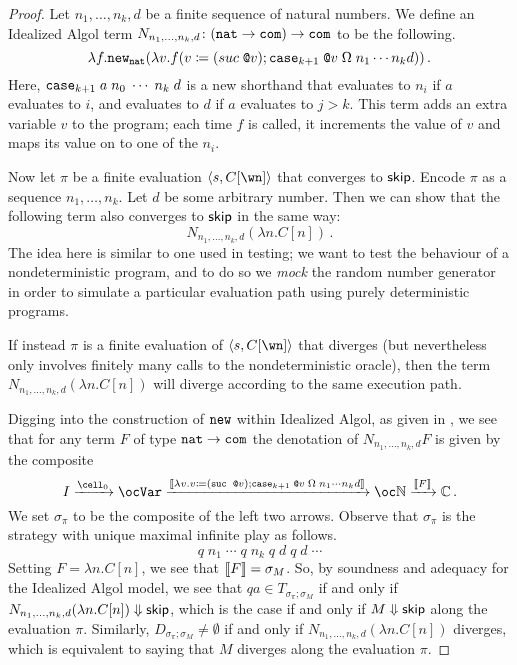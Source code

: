 \documentclass[sigplan,10pt,review]{acmart}\settopmatter{printfolios=true,printccs=false,printacmref=false}
\begin{document}
\begin{proof}
  Let $n_1,\dots,n_k,d$ be a finite sequence of natural numbers.  
  We define an Idealized Algol term $N_{n_1,\dots,n_k,d}\colon ({\mathtt{nat}} \to {\mathtt{com}}) \to {\mathtt{com}}$ to be the following.
  \[
    \lambda f.{\mathtt{new}}_{\mathtt{nat}} (\lambda v.f(v\coloneqq (suc\;\texttt{@} v); {\mathtt{case}}_{k+1}\;\texttt{@} v\;\Omega\;n_1 \cdots n_k d))\,.
    \]
  Here, ${\mathtt{case}}_{k+1}\;a\;n_0\;\cdots\;n_k\;d$ is a new shorthand that evaluates to $n_i$ if $a$ evaluates to $i$, and evaluates to $d$ if $a$ evaluates to $j> k$.
  This term adds an extra variable $v$ to the program; each time $f$ is called, it increments the value of $v$ and maps its value on to one of the $n_i$.  

  Now let $\pi$ be a finite evaluation $\ia s {C[\wn]}$ that converges to ${\mathsf{skip}}$.  
  Encode $\pi$ as a sequence $n_1,\dots,n_k$.  
  Let $d$ be some arbitrary number.
  Then we can show that the following term also converges to ${\mathsf{skip}}$ in the same way:
  \[
    N_{n_1,\dots,n_k,d} (\lambda n.C[n])\,.
    \]
  The idea here is similar to one used in testing; we want to test the behaviour of a nondeterministic program, and to do so we \emph{mock} the random number generator in order to simulate a particular evaluation path using purely deterministic programs.  

  If instead $\pi$ is a finite evaluation of $\ia s {C[\wn]}$ that diverges (but nevertheless only involves finitely many calls to the nondeterministic oracle), then the term $N_{n_1,\dots,n_k,d} (\lambda n.C[n])$ will diverge according to the same execution path.

  Digging into the construction of ${\mathtt{new}}$ within Idealized Algol, as given in \cite{SamsonGuyIAPassive}, we see that for any term $F$ of type ${\mathtt{nat}}\to{\mathtt{com}}$ the denotation of $N_{n_1,\dots,n_k,d} F$ is given by the composite
  \[
    I \xrightarrow{\cell_{0}}
    \oc \Var \xrightarrow{\deno{\lambda v.v\coloneqq (\suc\;\deref v);\case_{k+1}\;\deref v\;\Omega\;n_1\cdots n_k d}}
    \oc\bN \xrightarrow{\deno F}
    \bC\,.
    \]
  We set $\sigma_\pi$ to be the composite of the left two arrows.  
  Observe that $\sigma_\pi$ is the strategy with unique maximal infinite play as follows.
  \[
    q\;n_1\;\cdots\;q\;n_k\;q\;d\;q\;d\;\cdots
    \]
  Setting $F = \lambda n.C[n]$, we see that $\left\llbracket F\right\rrbracket=\sigma_M$.  
  So, by soundness and adequacy for the Idealized Algol model, we see that $qa\in T_{\sigma_\pi;\sigma_M}$ if and only if $N_{n_1,\dots,n_k,d} (\lambda n.C[n])\Downarrow{\mathsf{skip}}$, which is the case if and only if $M\Downarrow{\mathsf{skip}}$ along the evaluation $\pi$.
  Similarly, $D_{\sigma_\pi;\sigma_M}\neq\emptyset$ if and only if $N_{n_1,\dots,n_k,d}(\lambda n.C[n])$ diverges, which is equivalent to saying that $M$ diverges along the evaluation $\pi$.


\end{proof}
\end{document}
